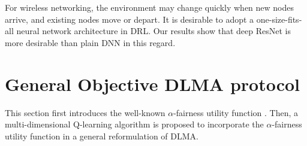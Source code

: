 \documentclass[journal,comsoc]{IEEEtran}
\begin{document}
For wireless networking, the environment may change quickly when new nodes arrive, and existing nodes move or depart. It is desirable to adopt a one-size-fits-all neural network architecture in DRL. Our results show that deep ResNet is more desirable than plain DNN in this regard.
  

\section{General Objective DLMA protocol}\label{general_objective}
This section first introduces the well-known  $ \alpha $-fairness utility function \cite{mo2000fair}. Then, a multi-dimensional Q-learning algorithm is proposed to incorporate the  $ \alpha $-fairness utility function in a general reformulation of DLMA. 
\end{document}
